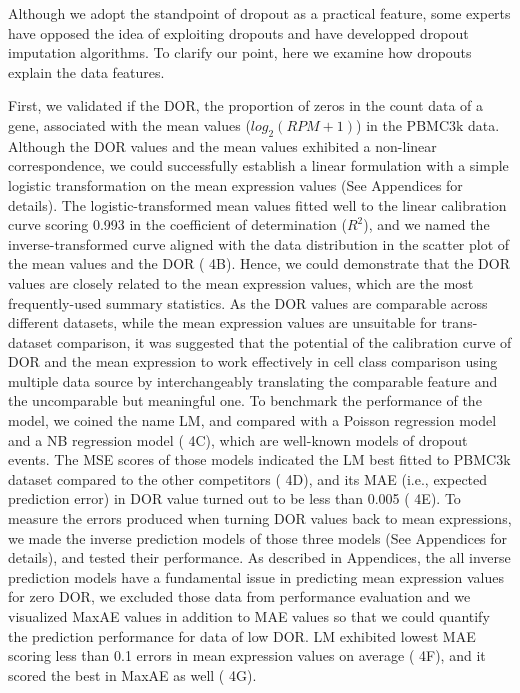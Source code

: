 \documentclass{article}
\begin{document}
Although we adopt the standpoint of dropout as a practical feature, some experts have opposed the idea of exploiting dropouts and have 
developped dropout imputation algorithms\cite{kim2020demystifying}. To clarify our point, here we examine how dropouts explain the data features.

First, we validated if the \ac{DOR}, the proportion of zeros in the count data of a gene, associated 
with the mean values ($log_2(RPM+1)$) in the PBMC3k data. Although the DOR values and the mean values 
exhibited a non-linear correspondence, we could successfully establish a linear formulation with a simple logistic 
transformation on the mean expression values (See Appendices for details). The logistic-transformed mean values 
fitted well to the linear calibration curve scoring 0.993 in the coefficient of determination ($R^2$), and we named the 
inverse-transformed curve aligned with the data distribution in the scatter plot of the mean values and the DOR 
(\figurename{ 4B}). Hence, we could demonstrate that the DOR values are closely related to the mean expression values, 
which are the most frequently-used summary statistics. As the DOR values are comparable across different datasets, 
while the mean expression values are unsuitable for trans-dataset comparison, it was suggested that the potential 
of the calibration curve of DOR and the mean expression to work effectively in cell class comparison using multiple 
data source by interchangeably translating the comparable feature and the uncomparable but meaningful 
one. To benchmark the performance of the model, we coined the name \ac{LM}, and compared with 
a Poisson regression model and a \ac{NB} regression model (\figurename{ 4C}), which are well-known models 
of dropout events\cite{choi2020bayesian}. The \ac{MSE} scores of those models indicated the LM best fitted to PBMC3k dataset compared 
to the other competitors (\figurename{ 4D}), and its \ac{MAE} (i.e., expected prediction error) in DOR 
value turned out to be less than 0.005 (\figurename{ 4E}). To measure the errors produced when turning DOR values back 
to mean expressions, we made the inverse prediction models of those three models (See Appendices for details), and 
tested their performance. As described in Appendices, the all inverse prediction models have a fundamental issue 
in predicting mean expression values for zero DOR, we excluded those data from performance evaluation and we visualized \ac{MaxAE} values in addition to MAE values so that we could quantify the 
prediction performance for data of low DOR. LM exhibited lowest MAE scoring less than 0.1 errors in mean 
expression values on average (\figurename{ 4F}), and it scored the best in MaxAE as well (\figurename{ 4G}).
\end{document}
